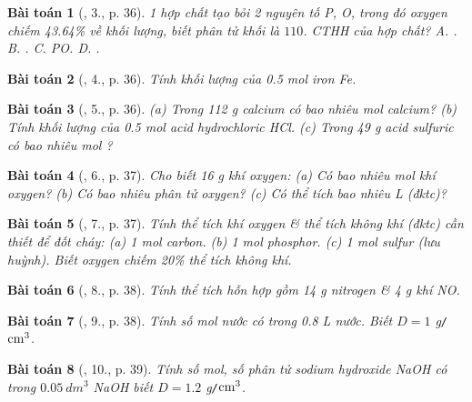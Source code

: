 \documentclass{article}
\newtheorem{baitoan}{Bài toán}
\begin{document}
\begin{baitoan}[\cite{An_Hoa_Hoc_nang_cao_8_9}, 3., p. 36]
	1 hợp chất tạo bỏi 2 nguyên tố {\rm P, O}, trong đó oxygen chiếm {\rm43.64\%} về khối lượng, biết phân tử khối là $110$. {\rm CTHH} của hợp chất? {\sf A.} {\rm{}}. {\sf B.} {\rm{}}. {\rm C.} {\rm PO}. {\sf D.} {\rm{}}.
\end{baitoan}

\begin{baitoan}[\cite{An_Hoa_Hoc_nang_cao_8_9}, 4., p. 36]
	Tính khối lượng của {\rm0.5 mol iron Fe}.
\end{baitoan}

\begin{baitoan}[\cite{An_Hoa_Hoc_nang_cao_8_9}, 5., p. 36]
	(a) Trong {\rm112 g} calcium có bao nhiêu mol calcium? (b) Tính khối lượng của {\rm0.5 mol} acid hydrochloric {\rm HCl}. (c) Trong {\rm49 g} acid sulfuric có bao nhiêu mol {\rm{}}?
\end{baitoan}

\begin{baitoan}[\cite{An_Hoa_Hoc_nang_cao_8_9}, 6., p. 37]
	Cho biết {\rm16 g} khí oxygen: (a) Có bao nhiêu mol khí oxygen? (b) Có bao nhiêu phân tử oxygen? (c) Có thể tích bao nhiêu {\rm L} (đktc)?
\end{baitoan}

\begin{baitoan}[\cite{An_Hoa_Hoc_nang_cao_8_9}, 7., p. 37]
	Tính thể tích khí oxygen \& thể tích không khí (đktc) cần thiết để đốt cháy: (a) {\rm1 mol carbon}. (b) {\rm1 mol} phosphor. (c) {\rm1 mol} sulfur (lưu huỳnh). Biết oxygen chiếm {\rm20\%} thể tích không khí.
\end{baitoan}

\begin{baitoan}[\cite{An_Hoa_Hoc_nang_cao_8_9}, 8., p. 38]
	Tính thể tích hỗn hợp gồm {\rm14 g} nitrogen \& {\rm4 g} khí {\rm NO}.
\end{baitoan}

\begin{baitoan}[\cite{An_Hoa_Hoc_nang_cao_8_9}, 9., p. 38]
	Tính số mol nước {\rm{}} có trong {\rm0.8 L} nước. Biết $D = 1$ {\rm g{\tt/}$\rm cm^3$}.
\end{baitoan}

\begin{baitoan}[\cite{An_Hoa_Hoc_nang_cao_8_9}, 10., p. 39]
	Tính số mol, số phân tử sodium hydroxide {\rm NaOH} có trong $0.05\ dm^3$ {\rm NaOH} biết $D = 1.2$ {\rm g{\tt/}$\rm cm^3$}.
\end{baitoan}
\end{document}
